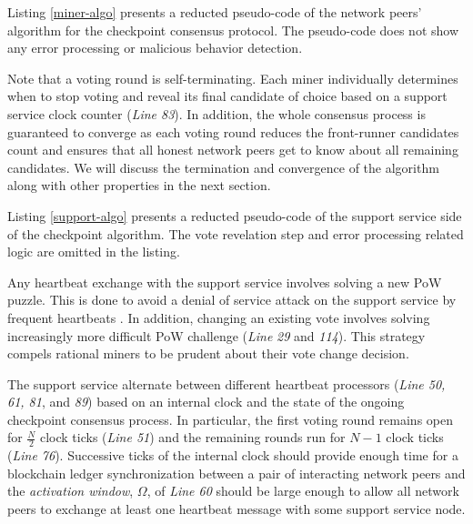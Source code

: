 \documentclass[conference]{IEEEtran}
\begin{document}
Listing \ref{miner-algo} presents a reducted pseudo-code of the network peers' algorithm for the checkpoint consensus protocol. The pseudo-code does not show any error processing or malicious behavior detection.

\lstset{caption=A miner's perspective of the checkpoint protocol, label=miner-algo}
 

Note that a voting round is self-terminating. Each miner individually determines when to stop voting and reveal its final candidate of choice based on a support service clock counter (\textit{Line 83}). In addition, the whole consensus process is guaranteed to converge as each voting round reduces the front-runner candidates count and ensures that all honest network peers get to know about all remaining candidates. We will discuss the termination and convergence of the algorithm along with other properties in the next section.

Listing \ref{support-algo} presents a reducted pseudo-code of the support service side of the checkpoint algorithm. The vote revelation step and error processing related logic are omitted in the listing.

\lstset{caption=Support service's perspective of the checkpoint protocol, label=support-algo}


Any heartbeat exchange with the support service involves solving a new PoW puzzle. This is done to avoid a denial of service attack on the support service by frequent heartbeats \cite{Back02hashcash}. In addition, changing an existing vote involves solving increasingly more difficult PoW challenge (\textit{Line} \textit{29} and \textit{114}). This strategy compels rational miners to be prudent about their vote change decision. 

The support service alternate between different heartbeat processors (\textit{Line 50, 61, 81}, and \textit{89}) based on an internal clock and the state of the ongoing checkpoint consensus process. In particular, the first voting round remains open for $\frac{N}{2}$ clock ticks (\textit{Line 51}) and the remaining rounds run for $N - 1$ clock ticks (\textit{Line 76}). Successive ticks of the internal clock should provide enough time for a blockchain ledger synchronization between a pair of interacting network peers and the \textit{activation window}, $\Omega$, of \textit{Line 60} should be large enough to allow all network peers to exchange at least one heartbeat message with some support service node.
\end{document}

